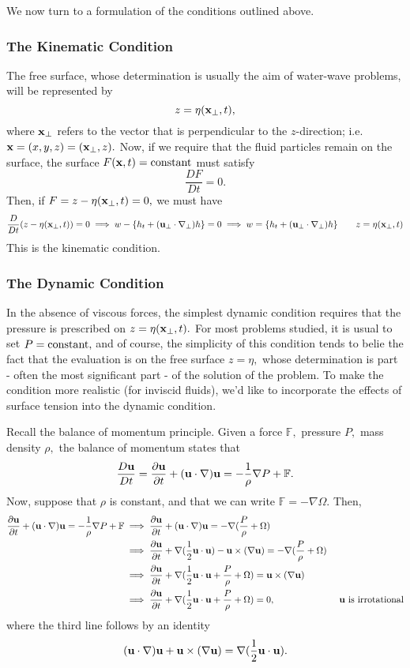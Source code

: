 \documentclass[10pt,reqno,oneside,a4paper]{article}
\begin{document}
We now turn to a formulation of the conditions outlined above.

\subsubsection*{The Kinematic Condition}
The free surface, whose determination is usually the aim of water-wave problems, will be represented by 
\[ 
z = \eta({\bf x}_{\perp}, t),
\]
where ${\bf x}_{\perp}$ refers to the vector that is perpendicular to the $z$-direction; i.e. ${\bf x} = (x,y,z)=({\bf x}_{\perp}, z).$ Now, if we require that the fluid particles remain on the surface, the surface $F({\bf x}, t) = {\rm constant}$ must satisfy 
\[ 
\frac{DF}{Dt} = 0.
\]
Then, if $F = z -  \eta({\bf x}_{\perp}, t) = 0,$ we must have 
\[ 
\frac{D}{Dt}(z -  \eta({\bf x}_{\perp}, t)) = 0 \implies w - \{ h_t + ({\bf u}_{\perp}\cdot \nabla_{\perp})h\} = 0 \implies w = \{ h_t + ({\bf u}_{\perp}\cdot \nabla_{\perp})h\} \qquad z = \eta({\bf x}_{\perp}, t)
\]
This is the kinematic condition.
\subsubsection*{The Dynamic Condition}
In the absence of viscous forces, the simplest dynamic condition requires that the pressure is prescribed on $z =  \eta({\bf x}_{\perp}, t).$ For most problems studied, it is usual to set $P = {\rm constant},$ and of course, the simplicity of this condition tends to belie the fact that the evaluation is on the free surface $z = \eta,$ whose determination is part - often the most significant part - of the solution of the problem. To make the condition more realistic (for inviscid fluids), we'd like to incorporate the effects of surface tension into the dynamic condition. 

Recall the balance of momentum principle. Given a force $\mathbb{F},$ pressure $P,$ mass density $\rho,$ the balance of momentum states that 
\[ 
\frac{D{\bf u}}{Dt} = \frac{\partial {\bf u}}{\partial t} + ({\bf u} \cdot \nabla) {\bf u} = -\frac{1}{\rho}\nabla P + \mathbb{F}.
\]
Now, suppose that $\rho$ is constant, and that we can write $\mathbb{F} = - \nabla \Omega.$ Then, 
\begin{align*}
\frac{\partial {\bf u}}{\partial t} + ({\bf u} \cdot \nabla) {\bf u} = -\frac{1}{\rho}\nabla P + \mathbb{F} &\implies \frac{\partial {\bf u}}{\partial t} + ({\bf u} \cdot \nabla) {\bf u} = - \nabla ( \frac{P}{\rho} + \Omega) \\
&\implies \frac{\partial {\bf u}}{\partial t} + \nabla (\frac{1}{2} {\bf u} \cdot {\bf u}) - {\bf u} \times (\nabla {\bf u}) = - \nabla ( \frac{P}{\rho} + \Omega) \\
&\implies \frac{\partial {\bf u}}{\partial t} + \nabla (\frac{1}{2} {\bf u} \cdot {\bf u} + \frac{P}{\rho} + \Omega) = {\bf u} \times (\nabla {\bf u}) \\
&\implies \frac{\partial {\bf u}}{\partial t} + \nabla (\frac{1}{2} {\bf u} \cdot {\bf u} + \frac{P}{\rho} + \Omega) = 0, &\text{ ${\bf u}$ is irrotational}
\end{align*}
where the third line follows by an identity 
\[
({\bf u} \cdot \nabla) {\bf u} + {\bf u} \times (\nabla {\bf u}) = \nabla (\frac{1}{2} {\bf u} \cdot {\bf u}).
\]
\end{document}
